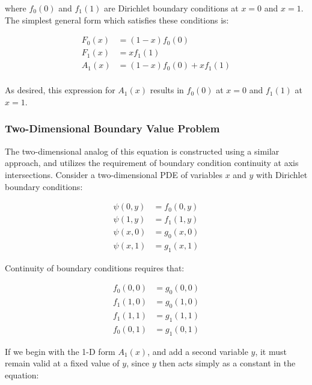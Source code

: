 \documentclass{article}
\begin{document}
\noindent where $f_0(0)$ and $f_1(1)$ are Dirichlet boundary conditions at $x=0$ and $x=1$. The simplest general form which satisfies these conditions is:

\begin{equation}
\begin{split}
  F_0(x) &= (1-x)f_0(0) \\
  F_1(x) &= xf_1(1) \\
  A_1(x) &= (1-x)f_0(0) + xf_1(1) \\
\end{split}
\end{equation}

\noindent As desired, this expression for $A_1(x)$ results in $f_0(0)$ at $x=0$ and $f_1(1)$ at $x=1$.

\subsubsection{Two-Dimensional Boundary Value Problem}

The two-dimensional analog of this equation is constructed using a similar approach, and utilizes the requirement of boundary condition continuity at axis intersections. Consider a two-dimensional PDE of variables $x$ and $y$ with Dirichlet boundary conditions:

\begin{equation}
\begin{split}
  \psi(0,y) &= f_0(0,y) \\
  \psi(1,y) &= f_1(1,y) \\
  \psi(x,0) &= g_0(x,0) \\
  \psi(x,1) &= g_1(x,1)
\end{split}
\label{bc2d}
\end{equation}

Continuity of boundary conditions requires that:

\begin{equation}
\begin{split}
  f_0(0,0) &= g_0(0,0) \\
  f_1(1,0) &= g_0(1,0) \\
  f_1(1,1) &= g_1(1,1) \\
  f_0(0,1) &= g_1(0,1)
\end{split}
\end{equation}

If we begin with the 1-D form $A_1(x)$, and add a second variable $y$, it must remain valid at a fixed value of $y$, since $y$ then acts simply as a constant in the equation:
\end{document}
